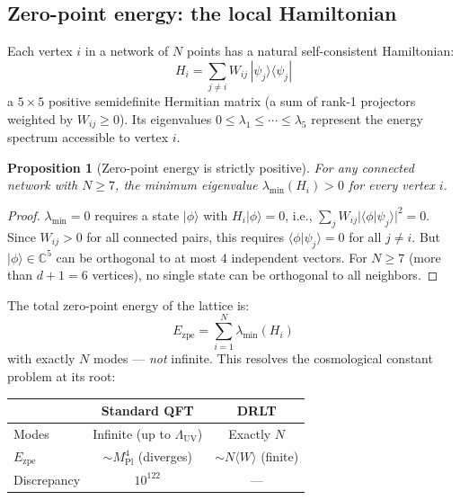 \documentclass[12pt]{article}
\newtheorem{proposition}[theorem]{Proposition}
\theoremstyle{remark}
\theoremstyle{definition}
\begin{document}
\subsection{Zero-point energy: the local Hamiltonian}

Each vertex $i$ in a network of $N$ points has a natural self-consistent Hamiltonian:
\begin{equation}
H_i = \sum_{j \neq i} W_{ij}\,|\psi_j\rangle\langle\psi_j|
\end{equation}
a $5\times 5$ positive semidefinite Hermitian matrix (a sum of rank-1 projectors weighted by $W_{ij} \geq 0$). Its eigenvalues $0 \leq \lambda_1 \leq \cdots \leq \lambda_5$ represent the energy spectrum accessible to vertex $i$.

\begin{proposition}[Zero-point energy is strictly positive]
For any connected network with $N \geq 7$, the minimum eigenvalue $\lambda_{\min}(H_i) > 0$ for every vertex $i$.
\end{proposition}

\begin{proof}
$\lambda_{\min} = 0$ requires a state $|\phi\rangle$ with $H_i|\phi\rangle = 0$, i.e., $\sum_j W_{ij}|\langle\phi|\psi_j\rangle|^2 = 0$. Since $W_{ij} > 0$ for all connected pairs, this requires $\langle\phi|\psi_j\rangle = 0$ for all $j \neq i$. But $|\phi\rangle \in \mathbb{C}^5$ can be orthogonal to at most 4 independent vectors. For $N \geq 7$ (more than $d + 1 = 6$ vertices), no single state can be orthogonal to all neighbors.
\end{proof}

The total zero-point energy of the lattice is:
\begin{equation}
E_\text{zpe} = \sum_{i=1}^{N} \lambda_{\min}(H_i)
\end{equation}
with exactly $N$ modes --- \emph{not} infinite. This resolves the cosmological constant problem at its root:

\begin{center}
\begin{tabular}{lcc}
\hline
& Standard QFT & DRLT \\
\hline
Modes & Infinite (up to $\Lambda_\text{UV}$) & Exactly $N$ \\
$E_\text{zpe}$ & $\sim M_\text{Pl}^4$ (diverges) & $\sim N\langle W\rangle$ (finite) \\
Discrepancy & $10^{122}$ & --- \\
\hline
\end{tabular}
\end{center}
\end{document}
